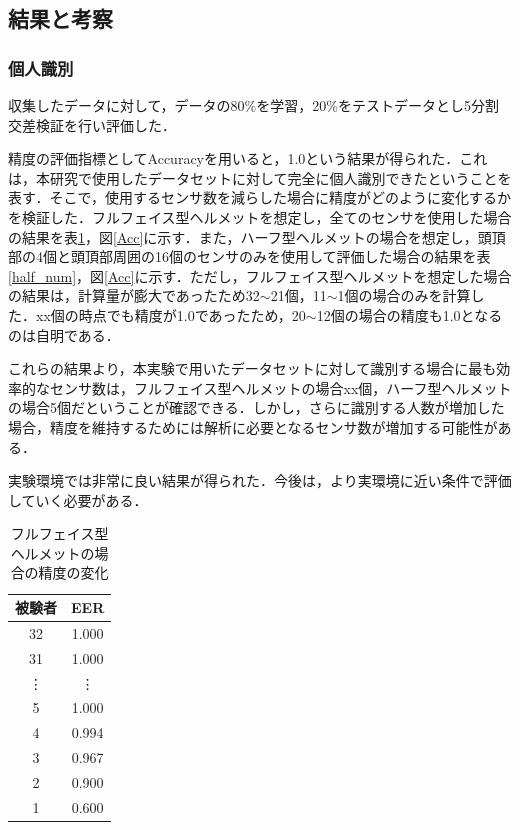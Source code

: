 \documentclass[Japanese,noauthor]{dicomopapers}
\begin{document}
\subsection{結果と考察}
\subsubsection{個人識別}
収集したデータに対して，データの80\%を学習，20\%をテストデータとし5分割交差検証を行い評価した．\par

精度の評価指標としてAccuracyを用いると，1.0という結果が得られた．これは，本研究で使用したデータセットに対して完全に個人識別できたということを表す．そこで，使用するセンサ数を減らした場合に精度がどのように変化するかを検証した．フルフェイス型ヘルメットを想定し，全てのセンサを使用した場合の結果を表\ref{full_num}，図\ref{Acc}に示す．また，ハーフ型ヘルメットの場合を想定し，頭頂部の4個と頭頂部周囲の16個のセンサのみを使用して評価した場合の結果を表\ref{half_num}，図\ref{Acc}に示す．ただし，フルフェイス型ヘルメットを想定した場合の結果は，計算量が膨大であったため32$\sim$21個，11$\sim$1個の場合のみを計算した．xx個の時点でも精度が1.0であったため，20$\sim$12個の場合の精度も1.0となるのは自明である．\par

これらの結果より，本実験で用いたデータセットに対して識別する場合に最も効率的なセンサ数は，フルフェイス型ヘルメットの場合xx個，ハーフ型ヘルメットの場合5個だということが確認できる．しかし，さらに識別する人数が増加した場合，精度を維持するためには解析に必要となるセンサ数が増加する可能性がある．\par

実験環境では非常に良い結果が得られた．今後は，より実環境に近い条件で評価していく必要がある．

\begin{table}[!t]
  \centering
  \caption{フルフェイス型ヘルメットの場合の精度の変化}
  \begin{tabular}{c|c} \hline\hline
    被験者 & EER \\ \hline
    32 & 1.000 \\
    31 & 1.000 \\
    \vdots & \vdots \\
    5 & 1.000 \\
    4 & 0.994 \\
    3 & 0.967 \\
    2 & 0.900 \\
    1 & 0.600 \\ \hline
  \end{tabular}
  \label{full_num}
\end{table}
\end{document}
